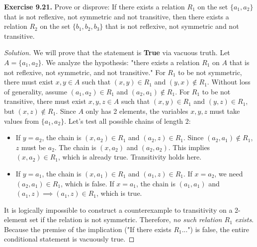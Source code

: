 \documentclass[11pt, a4paper]{article}
\theoremstyle{definition}
\theoremstyle{remark}
\begin{document}
\vspace{1em}
\textbf{Exercise 9.21.} Prove or disprove: If there exists a relation $R_1$ on the set $\{a_1, a_2\}$ that is not reflexive, not symmetric and not transitive, then there exists a relation $R_2$ on the set $\{b_1, b_2, b_3\}$ that is not reflexive, not symmetric and not transitive.
\begin{proof}[Solution]
We will prove that the statement is \textbf{True} via vacuous truth. 
Let $A = \{a_1, a_2\}$. We analyze the hypothesis: "there exists a relation $R_1$ on $A$ that is not reflexive, not symmetric, and not transitive."
For $R_1$ to be not symmetric, there must exist $x, y \in A$ such that $(x, y) \in R_1$ and $(y, x) \notin R_1$. Without loss of generality, assume $(a_1, a_2) \in R_1$ and $(a_2, a_1) \notin R_1$.
For $R_1$ to be not transitive, there must exist $x, y, z \in A$ such that $(x, y) \in R_1$ and $(y, z) \in R_1$, but $(x, z) \notin R_1$. 
Since $A$ only has 2 elements, the variables $x, y, z$ must take values from $\{a_1, a_2\}$. Let's test all possible chains of length 2:
\begin{itemize}
    \item If $y = a_2$, the chain is $(x, a_2) \in R_1$ and $(a_2, z) \in R_1$. Since $(a_2, a_1) \notin R_1$, $z$ must be $a_2$. The chain is $(x, a_2)$ and $(a_2, a_2)$. This implies $(x, a_2) \in R_1$, which is already true. Transitivity holds here.
    \item If $y = a_1$, the chain is $(x, a_1) \in R_1$ and $(a_1, z) \in R_1$. If $x = a_2$, we need $(a_2, a_1) \in R_1$, which is false. If $x = a_1$, the chain is $(a_1, a_1)$ and $(a_1, z) \implies (a_1, z) \in R_1$, which is true.
\end{itemize}
It is logically impossible to construct a counterexample to transitivity on a 2-element set if the relation is not symmetric. Therefore, \textit{no such relation $R_1$ exists}.
Because the premise of the implication ("If there exists $R_1$...") is false, the entire conditional statement is vacuously true.
\end{proof}
\end{document}
